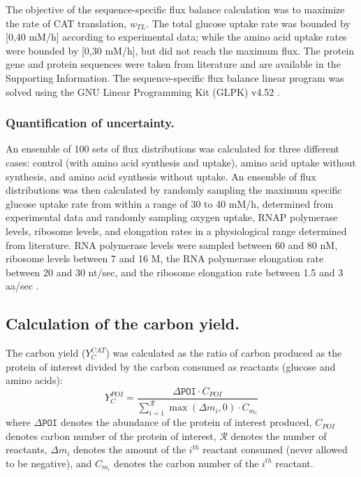 \documentclass[journal=asbcd6,manuscript=article]{achemso}
\begin{document}
The objective of the sequence-specific flux balance calculation was to maximize the rate of CAT translation, $w_{TL}$.
The total glucose uptake rate was bounded by [0,40 mM/h] according to experimental data;
while the amino acid uptake rates were bounded by [0,30 mM/h], but did not reach the maximum flux.
The protein gene and protein sequences were taken from literature and are available in the Supporting Information.
The sequence-specific flux balance linear program was solved using the GNU Linear Programming Kit (GLPK) v4.52 \cite{GLPK}.


\subsubsection*{Quantification of uncertainty.}
An ensemble of 100 sets of flux distributions was calculated for three different cases: control (with amino acid synthesis and uptake), amino acid uptake without synthesis, and amino acid synthesis without uptake.
An ensemble of flux distributions was then calculated by randomly sampling the maximum specific glucose uptake rate from within a range of 30 to 40 mM/h, determined from experimental data and randomly sampling oxygen uptake, RNAP polymerase levels, ribosome levels, and elongation rates in a physiological range determined from literature.
RNA polymerase levels were sampled between 60 and 80 nM, ribosome levels between 7 and 16 \textmu M, the RNA polymerase elongation rate between 20 and 30 nt/sec, and the ribosome elongation rate between 1.5 and 3 aa/sec \cite{2005_underwood_biotech, Garamella:2016aa}.

\subsection*{Calculation of the carbon yield.}
The carbon yield ($Y_{C}^{CAT}$) was calculated as the ratio of carbon produced as the protein of interest divided by the carbon consumed as reactants (glucose and amino acids):
\begin{equation}\label{eqn:yield-definition}
	Y_{C}^{POI}=\frac{\Delta\texttt{POI}\cdot C_{POI}}{\displaystyle\sum_{i=1}^{\mathcal{R}}\max(\Delta m_{i},0)\cdot C_{m_i}}
\end{equation}
where $\Delta\texttt{POI}$ denotes the abundance of the protein of interest produced, $C_{POI}$ denotes carbon number of the protein of interest, $\mathcal{R}$ denotes the number of reactants,
$\Delta m_{i}$ denotes the amount of the $i^{th}$ reactant consumed (never allowed to be negative), and $C_{m_i}$ denotes the carbon number of the $i^{th}$ reactant.
\end{document}
